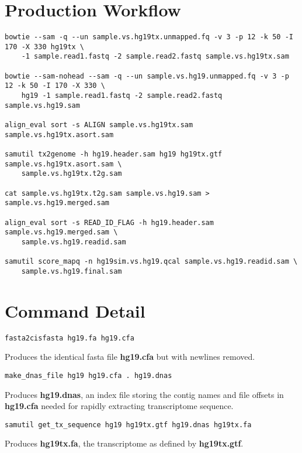 \documentclass[10pt]{article}
\begin{document}
\section{Production Workflow}
{\small
\begin{verbatim}
bowtie --sam -q --un sample.vs.hg19tx.unmapped.fq -v 3 -p 12 -k 50 -I 170 -X 330 hg19tx \
    -1 sample.read1.fastq -2 sample.read2.fastq sample.vs.hg19tx.sam

bowtie --sam-nohead --sam -q --un sample.vs.hg19.unmapped.fq -v 3 -p 12 -k 50 -I 170 -X 330 \
    hg19 -1 sample.read1.fastq -2 sample.read2.fastq sample.vs.hg19.sam

align_eval sort -s ALIGN sample.vs.hg19tx.sam sample.vs.hg19tx.asort.sam

samutil tx2genome -h hg19.header.sam hg19 hg19tx.gtf sample.vs.hg19tx.asort.sam \
    sample.vs.hg19tx.t2g.sam

cat sample.vs.hg19tx.t2g.sam sample.vs.hg19.sam > sample.vs.hg19.merged.sam

align_eval sort -s READ_ID_FLAG -h hg19.header.sam sample.vs.hg19.merged.sam \
    sample.vs.hg19.readid.sam

samutil score_mapq -n hg19sim.vs.hg19.qcal sample.vs.hg19.readid.sam \
    sample.vs.hg19.final.sam
\end{verbatim}
}

\section{Command Detail}

{\small
\begin{verbatim}
fasta2cisfasta hg19.fa hg19.cfa
\end{verbatim}
}


Produces the identical fasta file \textbf{hg19.cfa} but with newlines
removed.

{\small
\begin{verbatim}
make_dnas_file hg19 hg19.cfa . hg19.dnas
\end{verbatim}
}


Produces \textbf{hg19.dnas}, an index file storing the contig names
and file offsets in \textbf{hg19.cfa} needed for rapidly extracting
transcriptome sequence.

{\small
\begin{verbatim}
samutil get_tx_sequence hg19 hg19tx.gtf hg19.dnas hg19tx.fa
\end{verbatim}
}


Produces \textbf{hg19tx.fa}, the transcriptome as defined by
\textbf{hg19tx.gtf}.
\end{document}
